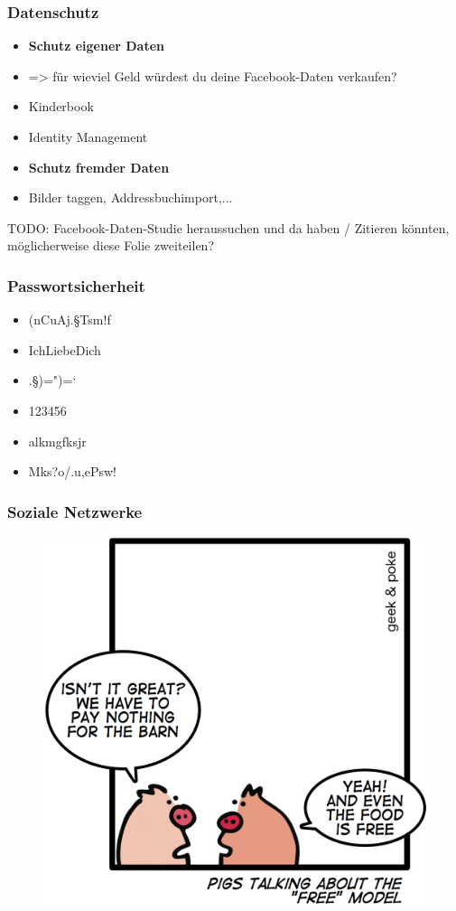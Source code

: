 \documentclass[12pt]{beamer}
\begin{document}
\begin{frame}
  \frametitle{Datenschutz}
  \begin{itemize}
    \item \textbf{Schutz eigener Daten}
    \item => für wieviel Geld würdest du deine Facebook-Daten verkaufen?
    \item Kinderbook
    \item Identity Management
    \item \textbf{Schutz fremder Daten}
    \item Bilder taggen, Addressbuchimport,...
  \end{itemize}
  TODO: Facebook-Daten-Studie heraussuchen und da haben / Zitieren könnten, möglicherweise diese Folie zweiteilen?
\end{frame}

\begin{frame}
  \frametitle{Passwortsicherheit}
  \begin{itemize}
    \item (nCuAj.§Tsm!f
    \item IchLiebeDich
    \item .§)=")=`
    \item 123456
    \item alkmgfksjr
    \item Mks?o/.u,ePsw!
  \end{itemize}
\end{frame}

\begin{frame}
  \frametitle{Soziale Netzwerke}
  \begin{figure}
    \includegraphics[height=0.7\textheight]{img/business_pigs.jpg}
  \end{figure}
\end{frame}
\end{document}
